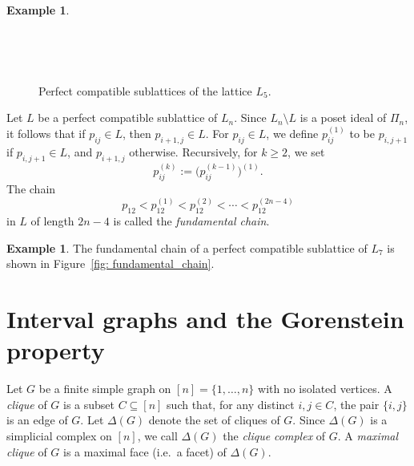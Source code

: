 \documentclass[12pt,a4paper]{amsart}
\theoremstyle{definition}
\newtheorem{Example}[Theorem]{Example}
\begin{document}
\begin{Example}
\begin{figure}
 \ \ \ \ \ \ \ \ \ 
 \ \ \ \ \ \ \ \ \ 
    \caption{Perfect compatible sublattices of the lattice $L_5$.}
    \label{fig: perfect_sublattices_L5}
\end{figure}
\end{Example}
Let \(L\) be a perfect compatible sublattice of \(L_n\). Since \(L_n \setminus L\) is a poset ideal of \(\Pi_n\), it follows that if \(p_{ij} \in L\), then \(p_{i+1,j} \in L\).  
For \(p_{ij} \in L\), we define \(p_{ij}^{(1)}\) to be \(p_{i,j+1}\) if \(p_{i,j+1} \in L\), and \(p_{i+1,j}\) otherwise. Recursively, for \(k \geq 2\), we set
\[
p_{ij}^{(k)} := \bigl(p_{ij}^{(k-1)}\bigr)^{(1)}.
\]
The chain
\[
p_{12} < p_{12}^{(1)} < p_{12}^{(2)} < \cdots < p_{12}^{(2n-4)}
 \]
in \(L\) of length \(2n-4\) is called the \emph{fundamental chain}.
\begin{Example}
    The fundamental chain of a perfect compatible sublattice of $L_7$ is shown in Figure~\ref{fig: fundamental_chain}.
\end{Example}





\section{Interval graphs and the Gorenstein property}  \label{sec: 3}
Let $G$ be a finite simple graph on $[n]=\{1, \ldots, n\}$ with no isolated vertices. 
A \emph{clique} of $G$ is a subset $C \subseteq [n]$ such that, for any distinct 
$i,j \in C$, the pair $\{i,j\}$ is an edge of $G$. 
Let $\Delta(G)$ denote the set of cliques of $G$. 
Since $\Delta(G)$ is a simplicial complex on $[n]$, we call $\Delta(G)$ the 
\emph{clique complex} of $G$. 
A \emph{maximal clique} of $G$ is a maximal face (i.e.~a facet) of $\Delta(G)$.
\end{document}
